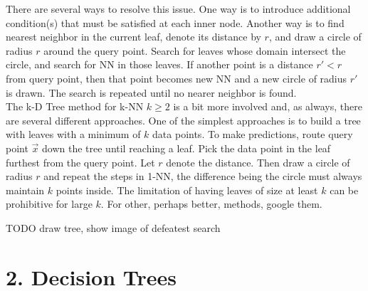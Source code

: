 \documentclass[10pt]{article}
\begin{document}
		There are several ways to resolve this issue. One way is to introduce additional condition(s) that must 
		be satisfied at each inner node. Another way is to find nearest neighbor in the current leaf, denote its 
		distance by $r$, and draw a circle of radius $r$ around the query point. Search for leaves whose domain 
		intersect the circle, and search for NN in those leaves. If another point is a distance $r' < r$ from query 
		point, then that point becomes new NN and a new circle of radius $r'$ is drawn. The search is repeated 
		until no nearer neighbor is found.  \\
		
		The k-D Tree method for k-NN $k \geq 2$ is a bit more involved and, as always, there are several different
		approaches. One of the simplest approaches is to build a tree with leaves with a minimum of $k$ data points.
		To make predictions, route query point $\vec x$ down the tree until reaching a leaf. Pick the data point in 
		the leaf furthest from the query point. Let $r$ denote the distance. Then draw a circle of radius $r$ and repeat
		the steps in 1-NN, the difference being the circle must always maintain $k$ points inside. The limitation of
		having leaves of size at least $k$ can be prohibitive for large $k$. For other, perhaps better, methods, 
		google them. 
		
	
	TODO draw tree, show image of defeatest search  

	
\section*{2. Decision Trees}
\end{document}
